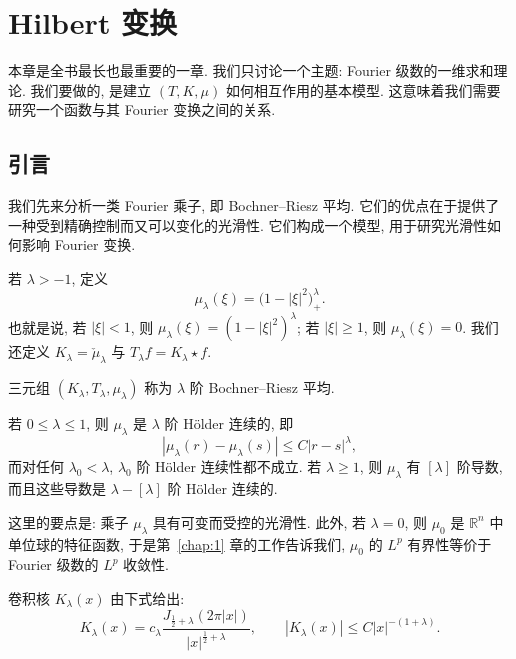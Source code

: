 \chapter{Hilbert 变换}
\label{chap:2}

本章是全书最长也最重要的一章. 我们只讨论一个主题: Fourier 级数的一维求和理论. 我们要做的, 是建立 $(T,K,\mu)$ 如何相互作用的基本模型. 这意味着我们需要研究一个函数与其 Fourier 变换之间的关系.

\section{引言}
\label{sec:2.1}

我们先来分析一类 Fourier 乘子, 即 Bochner--Riesz 平均. 它们的优点在于提供了一种受到精确控制而又可以变化的光滑性. 它们构成一个模型, 用于研究光滑性如何影响 Fourier 变换.

\begin{definition}\label{def:2.1}
若 $\lambda>-1$, 定义
\[
\mu_{\lambda}(\xi)=\bigl(1-|\xi|^{2}\bigr)_{+}^{\lambda}.
\]
也就是说, 若 $|\xi|<1$, 则 $\mu_\lambda(\xi)=(1-|\xi|^2)^{\lambda}$; 若 $|\xi|\geq 1$, 则 $\mu_\lambda(\xi)=0$. 我们还定义 $K_\lambda=\check{\mu}_\lambda$ 与 $T_\lambda f=K_\lambda\star f$.

三元组 $(K_{\lambda},T_{\lambda},\mu_{\lambda})$ 称为 $\lambda$ 阶 Bochner--Riesz 平均.
\end{definition}

\begin{remark}\label{rem:2.2}
若 $0\leq\lambda\leq 1$, 则 $\mu_{\lambda}$ 是 $\lambda$ 阶 H\"older 连续的, 即
\[
|\mu_{\lambda}(r)-\mu_{\lambda}(s)|\leq C|r-s|^{\lambda},
\]
而对任何 $\lambda_0<\lambda$, $\lambda_0$ 阶 H\"older 连续性都不成立. 若 $\lambda\geq 1$, 则 $\mu_\lambda$ 有 $[\lambda]$ 阶导数, 而且这些导数是 $\lambda-[\lambda]$ 阶 H\"older 连续的.

这里的要点是: 乘子 $\mu_\lambda$ 具有可变而受控的光滑性. 此外, 若 $\lambda=0$, 则 $\mu_0$ 是 $\mathbb{R}^n$ 中单位球的特征函数, 于是第~\ref{chap:1} 章的工作告诉我们, $\mu_0$ 的 $L^p$ 有界性等价于 Fourier 级数的 $L^p$ 收敛性.
\end{remark}

\begin{proposition}\label{prop:2.3}
卷积核 $K_{\lambda}(x)$ 由下式给出:
\[
K_{\lambda}(x)=c_{\lambda}\frac{J_{\frac{1}{2}+\lambda}(2\pi|x|)}{|x|^{\frac{1}{2}+\lambda}},
\qquad |K_{\lambda}(x)|\leq C|x|^{-(1+\lambda)}.
\]
\end{proposition}

